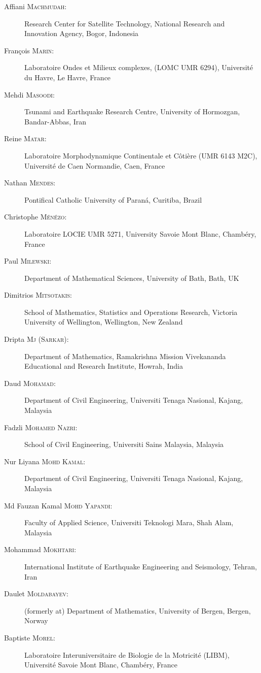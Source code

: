 \begin{description}
  \item[Affiani \textsc{Machmudah}:] Research Center for Satellite Technology, National Research and Innovation Agency, Bogor, Indonesia
  \item[Fran\c{c}ois \textsc{Marin}:] Laboratoire Ondes et Milieux complexes, (LOMC UMR 6294), Universit\'e du Havre, Le Havre, France
  \item[Mehdi \textsc{Masoodi}:] Tsunami and Earthquake Research Centre, University of Hormozgan, Bandar-Abbas, Iran
  \item[Reine \textsc{Matar}:] Laboratoire Morphodynamique Continentale et C\^oti\`ere (UMR 6143 M2C), Universit\'e de Caen Normandie, Caen, France
  \item[Nathan \textsc{Mendes}:] Pontifical Catholic University of Paran\'a, Curitiba, Brazil
  \item[Christophe \textsc{M\'en\'ezo}:] Laboratoire LOCIE UMR 5271, University Savoie Mont Blanc, Chamb\'ery, France
  \item[Paul \textsc{Milewski}:] Department of Mathematical Sciences, University of Bath, Bath, UK
  \item[Dimitrios \textsc{Mitsotakis}:] School of Mathematics, Statistics and Operations Research, Victoria University of Wellington, Wellington, New Zealand
  \item[Dripta \textsc{Mj} (\textsc{Sarkar}):] Department of Mathematics, Ramakrishna Mission Vivekananda Educational and Research Institute, Howrah, India
  \item[Daud \textsc{Mohamad}:] Department of Civil Engineering, Universiti Tenaga Nasional, Kajang, Malaysia
  \item[Fadzli \textsc{Mohamed Nazri}:] School of Civil Engineering, Universiti Sains Malaysia, Malaysia
  \item[Nur Liyana \textsc{Mohd Kamal}:] Department of Civil Engineering, Universiti Tenaga Nasional, Kajang, Malaysia
  \item[Md Fauzan Kamal \textsc{Mohd Yapandi}:] Faculty of Applied Science, Universiti Teknologi Mara, Shah Alam, Malaysia
  \item[Mohammad \textsc{Mokhtari}:] International Institute of Earthquake Engineering and Seismology, Tehran, Iran
  \item[Daulet \textsc{Moldabayev}:] (formerly at) Department of Mathematics, University of Bergen, Bergen, Norway
  \item[Baptiste \textsc{Morel}:] Laboratoire Interuniversitaire de Biologie de la Motricit\'e (LIBM), Universit\'e Savoie Mont Blanc, Chamb\'ery, France

\end{description}
